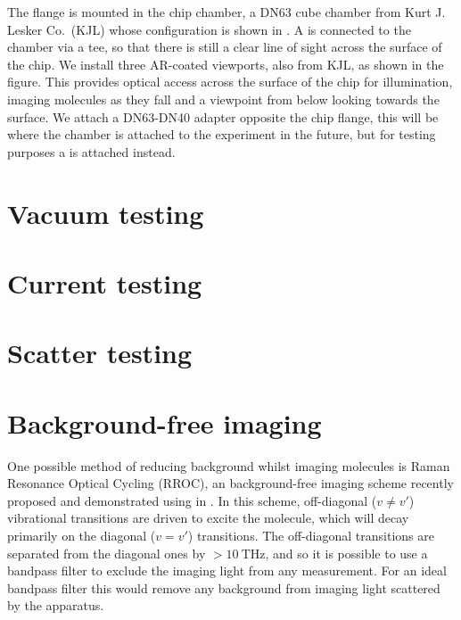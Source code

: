 The flange is mounted in the chip chamber, a DN63 cube chamber from Kurt J.
Lesker Co.\ (KJL) whose configuration is shown in .
A  is connected to the chamber via a tee, so that there is still
a clear line of sight across the surface of the chip. We install three
AR-coated viewports, also from KJL, as shown in the figure. This provides
optical access across the surface of the chip for illumination, imaging
molecules as they fall and a viewpoint from below looking towards the surface.
We attach a DN63-DN40 adapter opposite the chip flange, this will be where the
chamber is attached to the \CaF{} experiment in the future, but for testing
purposes a  is attached instead.

\begin{figure}
  \centering
  \caption{}
  \label{exper:fig:chamber}
\end{figure}


\section{Vacuum testing}


\section{Current testing}


\section{Scatter testing}


\section{Background-free imaging}


One possible method of reducing background whilst imaging molecules is Raman
Resonance Optical Cycling (RROC), an background-free imaging scheme recently
proposed and demonstrated using \SrF{} in . In this scheme,
off-diagonal ($v\neq v'$) vibrational transitions are driven to excite the
molecule, which will decay primarily on the diagonal ($v=v'$) transitions. The
off-diagonal transitions are separated from the diagonal ones by
$>\SI{10}{\tera\hertz}$, and so it is possible to use a bandpass filter to
exclude the imaging light from any measurement. For an ideal bandpass filter
this would remove any background from imaging light scattered by the apparatus.

